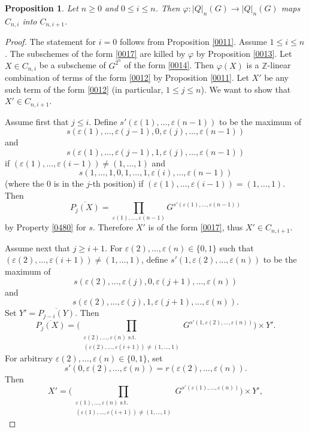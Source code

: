 \documentclass{amsart}
\newtheorem{Prop}[Thm]{Proposition}
\theoremstyle{remark}
\numberwithin{equation}{subsection}
\newcommand{\closure}[1]{\overline{#1}}
\newcommand{\Z}{\mathbb{Z}}
\begin{document}
\begin{Prop} \label{0018}
	Let $n \ge 0$ and $0 \le i \le n$.
	Then $\varphi \colon |Q|_{n}(G) \to |Q|_{n}(G)$ maps
	$C_{n, i}$ into $C_{n, i + 1}$.
\end{Prop}

\begin{proof}
	The statement for $i = 0$ follows from
	Proposition \ref{0011}.
	Assume $1 \le i \le n$.
	The subschemes of the form \eqref{0017} are killed by $\varphi$
	by Proposition \ref{0013}.
	Let $X \in C_{n, i}$ be a subscheme of $G^{2^{n}}$ of the form
	\eqref{0014}.
	Then $\varphi(X)$ is a $\Z$-linear combination of terms of the form
	\eqref{0012}
	by Proposition \ref{0011}.
	Let $X'$ be any such term of the form \eqref{0012}
	(in particular, $1 \le j \le n$).
	We want to show that $X' \in C_{n, i + 1}$.
	
	Assume first that $j \le i$.
	Define $s'(\varepsilon(1), \dots, \varepsilon(n - 1))$ to be the maximum of
		\[
			s(\varepsilon(1), \dots, \varepsilon(j - 1), 0, \varepsilon(j), \dots, \varepsilon(n - 1))
		\]
	and
		\[
			s(\varepsilon(1), \dots, \varepsilon(j - 1), 1, \varepsilon(j), \dots, \varepsilon(n - 1))
		\]
	if $(\varepsilon(1), \dots, \varepsilon(i - 1)) \ne (1, \dots, 1)$
	and
		\[
			s(1, \dots, 1, 0, 1, \dots, 1, \varepsilon(i), \dots, \varepsilon(n - 1))
		\]
	(where the $0$ is in the $j$-th position) if
	$(\varepsilon(1), \dots, \varepsilon(i - 1)) = (1, \dots, 1)$.
	Then
		\[
				\closure{P_{j}(X)}
			=
				\prod_{\varepsilon(1), \dots, \varepsilon(n - 1)}
					G^{s'(\varepsilon(1), \dots, \varepsilon(n - 1))}
		\]
	by Property \eqref{0480} for $s$.
	Therefore $X'$ is of the form \eqref{0017},
	thus $X' \in C_{n, i + 1}$.
	
	Assume next that $j \ge i + 1$.
	For $\varepsilon(2), \dots, \varepsilon(n) \in \{0, 1\}$ such that
	$(\varepsilon(2), \dots, \varepsilon(i + 1)) \ne (1, \dots, 1)$,
	define $s'(1, \varepsilon(2), \dots, \varepsilon(n))$ to be the maximum of
		\[
			s(\varepsilon(2), \dots, \varepsilon(j), 0, \varepsilon(j + 1), \dots, \varepsilon(n))
		\]
	and
		\[
			s(\varepsilon(2), \dots, \varepsilon(j), 1, \varepsilon(j + 1), \dots, \varepsilon(n)).
		\]
	Set $Y' = \closure{P_{j - i}(Y)}$.
	Then
		\begin{equation} \label{0458}
				\closure{P_{j}(X)}
			=
					\Biggl(
						\prod_{\substack{
							\varepsilon(2), \dots, \varepsilon(n) \text{ s.t.} \\
							(\varepsilon(2), \dots, \varepsilon(i + 1)) \ne (1, \dots, 1)
						}}
							G^{s'(1, \varepsilon(2), \dots, \varepsilon(n))}
					\Biggr)
				\times
					Y'.
		\end{equation}
	For arbitrary $\varepsilon(2), \dots, \varepsilon(n) \in \{0, 1\}$,
	set
		\[
				s'(0, \varepsilon(2), \dots, \varepsilon(n))
			=
				r(\varepsilon(2), \dots, \varepsilon(n)).
		\]
	Then
		\[
				X'
			=
					\Biggl(
						\prod_{\substack{
							\varepsilon(1), \dots, \varepsilon(n) \text{ s.t.} \\
							(\varepsilon(1), \dots, \varepsilon(i + 1)) \ne (1, \dots, 1)
						}}
							G^{s'(\varepsilon(1), \dots, \varepsilon(n))}
					\Biggr)
				\times
					Y',
		\]
	

\end{proof}
\end{document}
